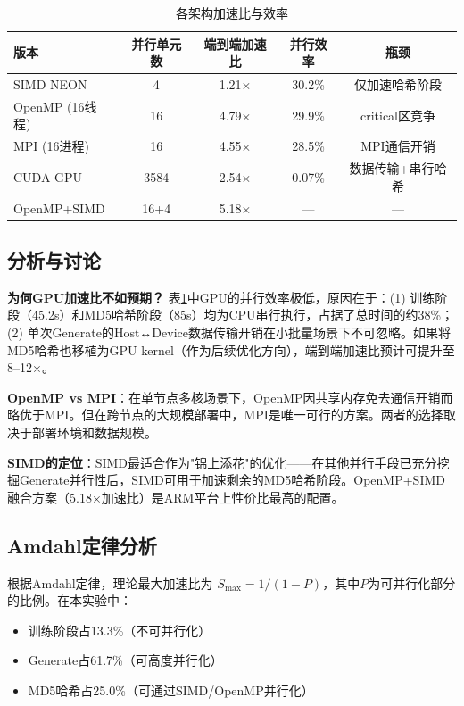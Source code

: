 \documentclass[12pt,a4paper]{ctexart}
\begin{document}
\begin{table}[ht]
\centering
\caption{各架构加速比与效率}
\label{tab:speedup}
\begin{tabular}{@{}p{2.8cm}cccc@{}}
\toprule
\textbf{版本} & \textbf{并行单元数} & \textbf{端到端加速比} & \textbf{并行效率} & \textbf{瓶颈} \\
\midrule
SIMD NEON       & 4     & 1.21× & 30.2\% & 仅加速哈希阶段 \\
OpenMP (16线程) & 16    & 4.79× & 29.9\% & critical区竞争 \\
MPI (16进程)    & 16    & 4.55× & 28.5\% & MPI通信开销 \\
CUDA GPU        & 3584  & 2.54× & 0.07\% & 数据传输+串行哈希 \\
OpenMP+SIMD     & 16+4  & 5.18× & —      & — \\
\bottomrule
\end{tabular}
\end{table}

\subsection{分析与讨论}

\textbf{为何GPU加速比不如预期？} 表\ref{tab:speedup}中GPU的并行效率极低，原因在于：(1) 训练阶段（45.2s）和MD5哈希阶段（85s）均为CPU串行执行，占据了总时间的约38\%；(2) 单次Generate的Host↔Device数据传输开销在小批量场景下不可忽略。如果将MD5哈希也移植为GPU kernel（作为后续优化方向），端到端加速比预计可提升至8--12×。

\textbf{OpenMP vs MPI}：在单节点多核场景下，OpenMP因共享内存免去通信开销而略优于MPI。但在跨节点的大规模部署中，MPI是唯一可行的方案。两者的选择取决于部署环境和数据规模。

\textbf{SIMD的定位}：SIMD最适合作为"锦上添花"的优化——在其他并行手段已充分挖掘Generate并行性后，SIMD可用于加速剩余的MD5哈希阶段。OpenMP+SIMD融合方案（5.18×加速比）是ARM平台上性价比最高的配置。

\subsection{Amdahl定律分析}

根据Amdahl定律，理论最大加速比为 $S_{\text{max}} = 1 / (1 - P)$，其中$P$为可并行化部分的比例。在本实验中：

\begin{itemize}[nosep]
    \item 训练阶段占13.3\%（不可并行化）
    \item Generate占61.7\%（可高度并行化）
    \item MD5哈希占25.0\%（可通过SIMD/OpenMP并行化）
\end{itemize}
\end{document}
